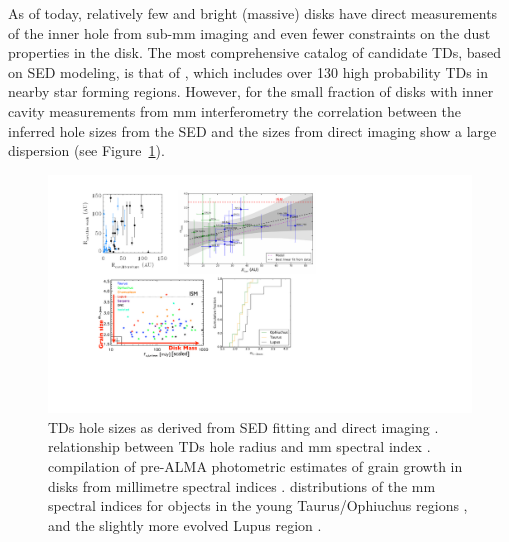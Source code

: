 \documentclass[10pt,fleqn,twoside]{article}
\begin{document}
As of today, relatively few and bright (massive) disks have direct measurements of the inner hole from sub-mm imaging
and even fewer constraints on the dust properties in the disk. The most comprehensive catalog of candidate TDs, based on SED modeling, is that of \citet{2016A&A...592A.126V}, which includes over 130 high probability TDs in nearby star forming regions. However, for the small fraction of disks with inner cavity measurements from mm interferometry the correlation between the inferred hole sizes from the SED and the sizes from direct imaging show a large dispersion (see Figure~\ref{f_TDsiz}). 
\begin{figure}
\centerline{\includegraphics[scale=0.7]{f_dust_radii_tds.pdf}}
\caption{ TDs hole sizes as derived from SED fitting
  and direct imaging \citep[black points only; adapted from][]{2016A&A...592A.126V}. 
   relationship between TDs hole radius
  and mm spectral index \citep[as a proxy of grain growth in disks, large grains
  correspond to small values of $\alpha$; adapted from][]{2014A&A...564A..51P}. 
   compilation of pre-ALMA photometric
  estimates of grain growth in disks from millimetre spectral indices
  \citep[adapted from][]{2014arXiv1402.1354T}. 
  distributions of the mm spectral indices for objects in the young
  Taurus/Ophiuchus regions  
  \citep[yellow/green lines, data from][]{2010A&A...521A..66R,2010A&A...512A..15R}, 
  and the slightly more evolved Lupus region \citep[black line, data
  from][]{2007A&A...462..211L,2012MNRAS.425.3137U}.}
\label{f_TDsiz}
\end{figure}
\end{document}
